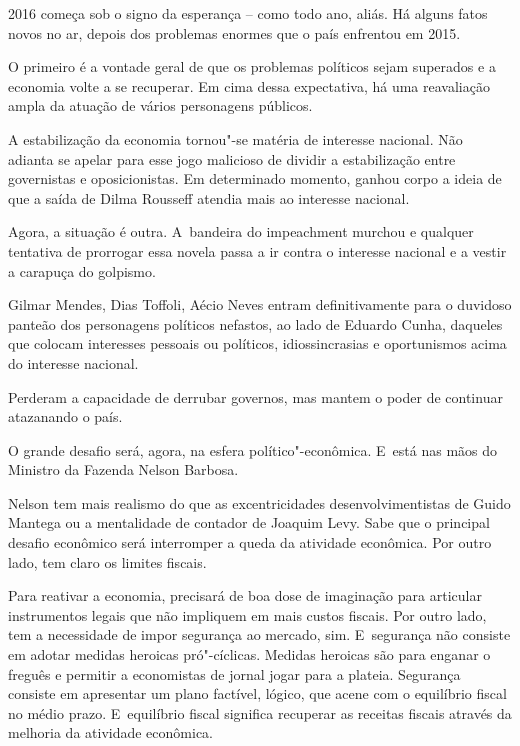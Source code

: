  

2016 começa sob o signo da esperança -- como todo ano, aliás. Há alguns
fatos novos no ar, depois dos problemas enormes que o país enfrentou em
2015.

O primeiro é a vontade geral de que os problemas políticos sejam
superados e a economia volte a se recuperar. Em cima dessa expectativa,
há uma reavaliação ampla da atuação de vários personagens públicos.

A estabilização da economia tornou"-se matéria de interesse nacional. Não
adianta se apelar para esse jogo malicioso de dividir a estabilização
entre governistas e oposicionistas. Em determinado momento, ganhou corpo
a ideia de que a saída de Dilma Rousseff atendia mais ao interesse
nacional.

Agora, a situação é outra. A~bandeira do impeachment murchou e qualquer
tentativa de prorrogar essa novela passa a ir contra o interesse
nacional e a vestir a carapuça do golpismo.

Gilmar Mendes, Dias Toffoli, Aécio Neves entram definitivamente para o
duvidoso panteão dos personagens políticos nefastos, ao lado de Eduardo
Cunha, daqueles que colocam interesses pessoais ou políticos,
idiossincrasias e oportunismos acima do interesse nacional.

Perderam a capacidade de derrubar governos, mas mantem o poder de
continuar atazanando o país.

\asterisc{}

O grande desafio será, agora, na esfera político"-econômica. E~está nas
mãos do Ministro da Fazenda Nelson Barbosa.

Nelson tem mais realismo do que as excentricidades desenvolvimentistas
de Guido Mantega ou a mentalidade de contador de Joaquim Levy. Sabe que
o principal desafio econômico será interromper a queda da atividade
econômica. Por outro lado, tem claro os limites fiscais.

Para reativar a economia, precisará de boa dose de imaginação para
articular instrumentos legais que não impliquem em mais custos fiscais.
Por outro lado, tem a necessidade de impor segurança ao mercado, sim. E~segurança não consiste em adotar medidas heroicas pró"-cíclicas. Medidas
heroicas são para enganar o freguês e permitir a economistas de jornal
jogar para a plateia. Segurança consiste em apresentar um plano
factível, lógico, que acene com o equilíbrio fiscal no médio prazo. E~equilíbrio fiscal significa recuperar as receitas fiscais através da
melhoria da atividade econômica.


